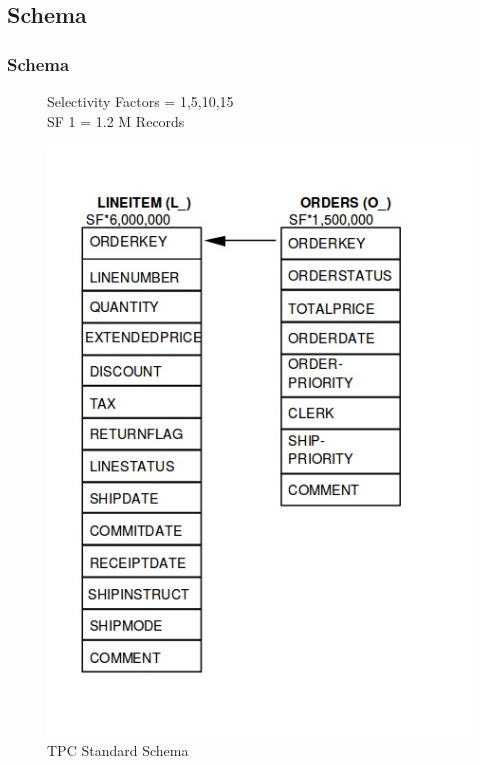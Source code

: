 \documentclass{beamer}
\begin{document}
\subsection{Schema}
\begin{frame}
\frametitle{Schema}
\begin{figure}
\centering
\begin{minipage}{.5\textwidth}
 \fontsize{10}{10}\selectfont Selectivity Factors = 1,5,10,15 \\
 \vspace{0.2cm}SF 1 = 1.2 M Records
\end{minipage}%
\begin{minipage}{.5\textwidth}
  \centering
  \includegraphics[scale=0.33]{img/Blinktopus-Schema.jpg}
  \caption{\fontsize{6}{5}\selectfont TPC Standard Schema}
\end{minipage}
\end{figure}
\end{frame}
\end{document}
